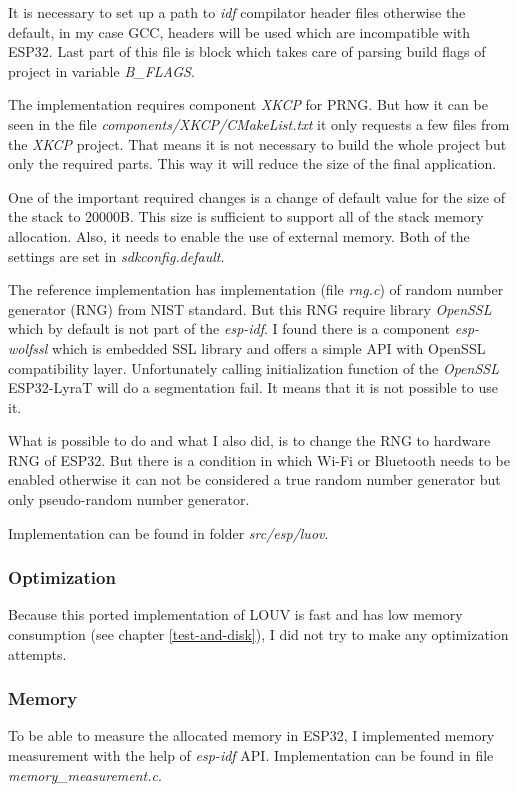 \documentclass[thesis=M,english]{FITthesis}[2019/12/23]
\begin{document}
\noindent
It is necessary to set up a path to \textit{idf} compilator header files otherwise the default, in my case GCC, headers will be used which are incompatible with ESP32.
Last part of this file is block which takes care of parsing build flags of project in variable \textit{B\_FLAGS}.

\bigskip
\noindent
The implementation requires component \textit{XKCP} for PRNG. But how it can be seen in the file \textit{components/XKCP/CMakeList.txt} it only requests a few files from the \textit{XKCP} project. That means it is not necessary to build the whole project but only the required parts. This way it will reduce the size of the final application.

\bigskip
\noindent
One of the important required changes is a change of default value for the size of the stack to 20000B. This size is sufficient to support all of the stack memory allocation. Also, it needs to enable the use of external memory. Both of the settings are set in \textit{sdkconfig.default}.

\bigskip
\noindent
The reference implementation has implementation (file \textit{rng.c}) of random number generator (RNG) from NIST standard. But this RNG require library \textit{OpenSSL} which by default is not part of the \textit{esp-idf}. I found there is a component \textit{esp-wolfssl} which is embedded SSL library and offers a simple API with OpenSSL compatibility layer. Unfortunately calling initialization function of the \textit{OpenSSL} ESP32-LyraT will do a segmentation fail. It means that it is not possible to use it.

\bigskip
\noindent
What is possible to do and what I also did, is to change the RNG to hardware RNG of ESP32. But there is a condition in which Wi-Fi or Bluetooth needs to be enabled otherwise it can not be considered a true random number generator but only pseudo-random number generator.

\bigskip
\noindent
Implementation can be found in folder \textit{src/esp/luov}.

\subsubsection{Optimization}
Because this ported implementation of LOUV is fast and has low memory consumption (see chapter \ref{test-and-disk}), I did not try to make any optimization attempts.

\subsubsection{Memory} \label{esp-luov-memory}
To be able to measure the allocated memory in ESP32, I implemented memory measurement with the help of \textit{esp-idf} API. Implementation can be found in file \textit{memory\_measurement.c}.
\end{document}
